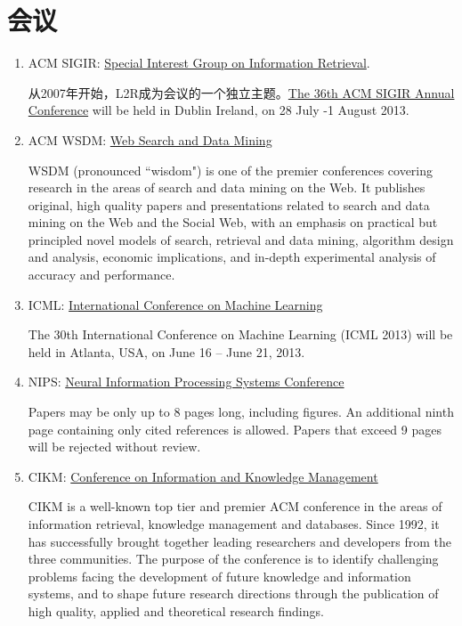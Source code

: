 \section{会议}
\begin{enumerate}[（1）]
\item ACM SIGIR: \href{http://www.sigir.org/}{Special Interest Group on Information Retrieval}.

从2007年开始，L2R成为会议的一个独立主题。\href{http://sigir2013.ie/}{The 36th ACM SIGIR Annual Conference} will be held in Dublin Ireland, on 28 July -1 August 2013.
\item ACM WSDM: \href{http://www.wsdm-conference.org/}{Web Search and Data Mining}

WSDM (pronounced ``wisdom") is one of the premier conferences covering research in the areas of search and data mining on the Web. It publishes original, high quality papers and presentations related to search and data mining on the Web and the Social Web, with an emphasis on practical but principled novel models of search, retrieval and data mining, algorithm design and analysis, economic implications, and in-depth experimental analysis of accuracy and performance.

\item ICML: \href{http://icml.cc/2013/}{International Conference on Machine Learning}

The 30th International Conference on Machine Learning (ICML 2013) will be held in Atlanta, USA, on June 16 – June 21, 2013.

\item NIPS: \href{http://books.nips.cc/}{Neural Information Processing Systems Conference}

Papers may be only up to 8 pages long, including figures. An additional ninth page containing only cited references is allowed. Papers that exceed 9 pages will be rejected without review.

\item CIKM: \href{http://www.cikmconference.org/}{Conference on Information and Knowledge Management}

CIKM is a well-known top tier and premier ACM conference in the areas of information retrieval, knowledge management and databases. Since 1992, it has successfully brought together leading researchers and developers from the three communities. The purpose of the conference is to identify challenging problems facing the development of future knowledge and information systems, and to shape future research directions through the publication of high quality, applied and theoretical research findings.


\end{enumerate}
